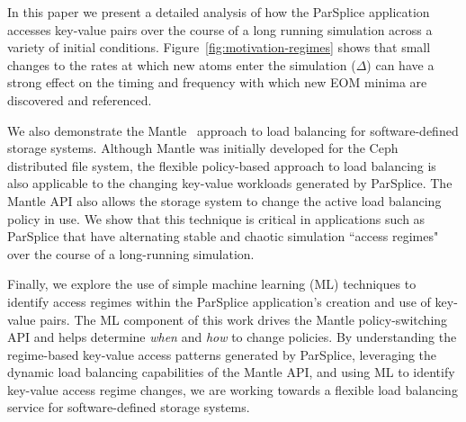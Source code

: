 In this paper we present a detailed analysis of how the ParSplice application
accesses key-value pairs over the course of a long running simulation across a
variety of initial conditions. Figure~\ref{fig:motivation-regimes} shows that
small changes to the rates at which new atoms enter the simulation (\(\Delta\))
can have a strong effect on the timing and frequency with which new EOM minima
are discovered and referenced.

We also demonstrate the Mantle~\cite{sevilla:sc15-mantle} approach to load
balancing for software-defined storage systems.  Although Mantle was initially
developed for the Ceph distributed file system, the flexible policy-based
approach to load balancing is also applicable to the changing key-value
workloads generated by ParSplice. The Mantle API also allows the storage system
to change the active load balancing policy in use. We show that this technique
is critical in applications such as ParSplice that have alternating stable and
chaotic simulation ``access regimes" over the course of a long-running
simulation.  

Finally, we explore the use of simple machine learning (ML) techniques to
identify access regimes within the ParSplice application's creation and use
of key-value pairs. The ML component of this work drives the Mantle
policy-switching API and helps determine \emph{when} and \emph{how} to change
policies. By understanding the regime-based key-value access patterns generated by
ParSplice, leveraging the dynamic load balancing capabilities of the Mantle
API, and using ML to identify key-value access regime changes, we are working
towards a flexible load balancing service for software-defined storage
systems. 
